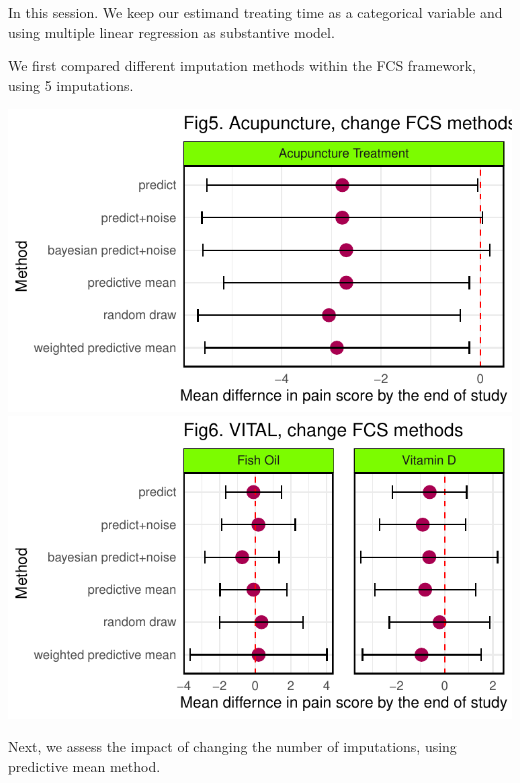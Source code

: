\documentclass{article}
\newcommand{\pandocbounded}[1]{#1}
\begin{document}
In this session. We keep our estimand treating time as a categorical
variable and using multiple linear regression as substantive model.

We first compared different imputation methods within the FCS framework,
using 5 imputations.

\pandocbounded{\includegraphics[keepaspectratio]{Final_Report_files/figure-latex/unnamed-chunk-38-1.pdf}}
\pandocbounded{\includegraphics[keepaspectratio]{Final_Report_files/figure-latex/unnamed-chunk-38-2.pdf}}

Next, we assess the impact of changing the number of imputations, using
predictive mean method.
\end{document}

